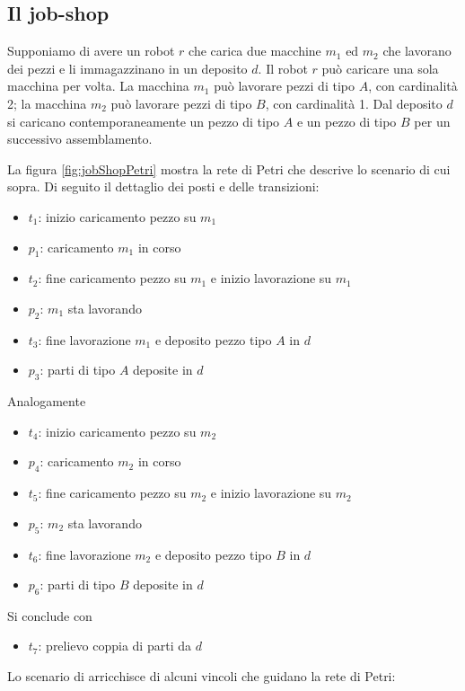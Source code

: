 \documentclass[a4paper]{report}
\begin{document}
\subsection{Il job-shop}
Supponiamo di avere un robot $r$ che carica due macchine $m_1$ ed
$m_2$ che lavorano dei pezzi e li immagazzinano in un deposito $d$. Il
robot $r$ pu\`o caricare una sola macchina per volta. La macchina
$m_1$ pu\`o lavorare pezzi di tipo $A$, con cardinalit\`a 2; la
macchina $m_2$ pu\`o lavorare pezzi di tipo $B$, con cardinalit\`a
1. Dal deposito $d$ si caricano contemporaneamente un pezzo di tipo
$A$ e un pezzo di tipo $B$ per un successivo assemblamento.

La figura \ref{fig:jobShopPetri} mostra la rete di Petri che descrive
lo scenario di cui sopra. Di seguito il dettaglio dei posti e delle
transizioni:
\begin{itemize}
\item $t_1$: inizio caricamento pezzo su $m_1$
\item $p_1$: caricamento $m_1$ in corso
\item $t_2$: fine caricamento pezzo su $m_1$ e inizio lavorazione su
  $m_1$
\item $p_2$: $m_1$ sta lavorando
\item $t_3$: fine lavorazione $m_1$ e deposito pezzo tipo $A$ in $d$
\item $p_3$: parti di tipo $A$ deposite in $d$
\end{itemize}
Analogamente
\begin{itemize}
\item $t_4$: inizio caricamento pezzo su $m_2$
\item $p_4$: caricamento $m_2$ in corso
\item $t_5$: fine caricamento pezzo su $m_2$ e inizio lavorazione su
  $m_2$
\item $p_5$: $m_2$ sta lavorando
\item $t_6$: fine lavorazione $m_2$ e deposito pezzo tipo $B$ in $d$
\item $p_6$: parti di tipo $B$ deposite in $d$
\end{itemize}
Si conclude con
\begin{itemize}
\item $t_7$: prelievo coppia di parti da $d$
\end{itemize}
Lo scenario di arricchisce di alcuni vincoli che guidano la rete di
Petri:
\end{document}
